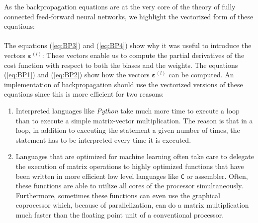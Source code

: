 As the backpropagation equations  are at the very core of the theory of
fully connected feed-forward neural networks, we highlight the vectorized form of these equations:
\\[0.2cm]
\hspace*{0.3cm}
\colorbox{red}{}
\\[0.2cm]
The equations (\ref{eq:BP3}) and (\ref{eq:BP4}) show why it was useful to introduce the
vectors $\boldsymbol{\varepsilon}^{(l)}$: These vectors enable us to compute the partial derivatives of the cost function
with respect to both the biases and the weights.  The equations (\ref{eq:BP1}) and (\ref{eq:BP2})
show how the vectors $\boldsymbol{\varepsilon}^{(l)}$ can be computed.  An implementation of backpropagation should use the vectorized
versions of these equations since this is more efficient for two reasons:
\begin{enumerate}
\item Interpreted languages like \textsl{Python} take much more time to
      execute a loop than to execute a simple matrix-vector multiplication.  The reason is that in a loop, in
      addition to executing the statement a given number of times, the statement has to be interpreted 
      every time it is executed.
\item Languages that are optimized for machine learning often take care to delegate the execution of matrix
      operations to highly optimized functions that have been written in more efficient low level languages like
      \texttt{C} or assembler.  Often, these functions are able to utilize all cores of the processor
      simultaneously.  Furthermore, sometimes these functions can even use the graphical coprocessor
      which, because of parallelization, can do a matrix multiplication much faster than the floating point unit of
      a conventional processor.
\end{enumerate}


